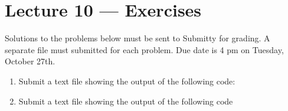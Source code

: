 \documentclass[letterpaper,10pt,english]{sphinxmanual}
\begin{document}
\chapter{Lecture 10 — Exercises}
\label{\detokenize{lecture_notes/lec10_lists2_exercises/exercises:lecture-10-exercises}}\label{\detokenize{lecture_notes/lec10_lists2_exercises/exercises::doc}}
Solutions to the problems below must be sent to Submitty for grading.
A separate file must submitted for each problem.
Due date is 4 pm on Tuesday, October 27th.
\begin{enumerate}
\item {} 
Submit a text file showing the output of the following code:

%
\begin{sphinxVerbatim}[commandchars=\\\{\}]
  \PYG{p}{[}   \PYG{p}{[} \PYG{p}{]}  \PYG{p}{]}
  
  
  
  
\end{sphinxVerbatim}

\item {} 
Submit a text file showing the output of the following code

%
\begin{sphinxVerbatim}[commandchars=\\\{\}]
 
      
      

  \PYG{p}{[} \PYG{p}{[} \PYG{p}{]}  \PYG{p}{]}
  
  
\PYG{p}{[}\PYG{p}{]}  


\end{sphinxVerbatim}
\end{enumerate}
\end{document}
